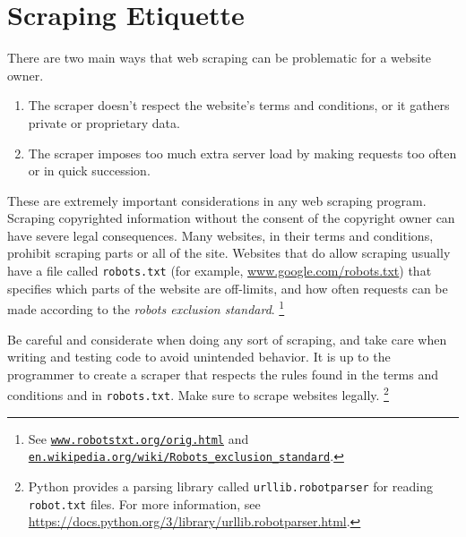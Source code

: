 

\section*{Scraping Etiquette} %


There are two main ways that web scraping can be problematic for a website owner.
\begin{enumerate}
\item The scraper doesn't respect the website's terms and conditions, or it gathers private or proprietary data.
\item The scraper imposes too much extra server load by making requests too often or in quick succession.
\end{enumerate}
These are extremely important considerations in any web scraping program.
Scraping copyrighted information without the consent of the copyright owner can have severe legal consequences.
Many websites, in their terms and conditions, prohibit scraping parts or all of the site.
Websites that do allow scraping usually have a file called \texttt{robots.txt} (for example, \url{www.google.com/robots.txt}) that specifies which parts of the website are off-limits, and how often requests can be made according to the \emph{robots exclusion standard}.%
\footnote{See \href{http://www.robotstxt.org/orig.html}{\texttt{www.robotstxt.org/orig.html}} and \href{https://en.wikipedia.org/wiki/Robots_exclusion_standard}{\texttt{en.wikipedia.org/wiki/Robots\_exclusion\_standard}}.}


\begin{warn} %
Be careful and considerate when doing any sort of scraping, and take care when writing and testing code to avoid unintended behavior.
It is up to the programmer to create a scraper that respects the rules found in the terms and conditions and in \texttt{robots.txt}.
Make sure to scrape websites legally.
\footnote{Python provides a parsing library called \texttt{urllib.robotparser} for reading \texttt{robot.txt} files.
For more information, see \url{https://docs.python.org/3/library/urllib.robotparser.html}.
}
\end{warn}

